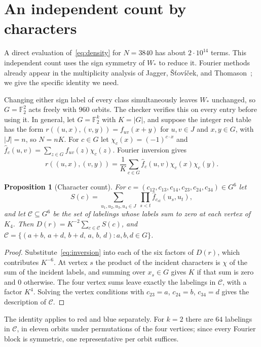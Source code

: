 \documentclass[11pt]{article}
\newtheorem{proposition}[theorem]{Proposition}
\theoremstyle{definition}
\theoremstyle{remark}
\newcommand{\FF}{\mathbb F}
\begin{document}
\section{An independent count by characters}
\label{app:count}
\label{sec:count}

A direct evaluation of~\eqref{eq:density} for $N=3840$ has about $2\cdot10^{14}$ terms.
This independent count uses the sign symmetry of $W_*$ to reduce it.
Fourier methods already appear in the multiplicity analysis of Jagger, \v{S}\v{t}ov\'{i}\v{c}ek, and Thomason~\cite{jagger1996}; we give the specific identity we need.

Changing either sign label of every class simultaneously leaves $W_*$ unchanged, so $G=\FF_2^2$ acts freely with $960$ orbits.
The checker verifies this on every entry before using it.
In general, let $G=\FF_2^k$ with $K=|G|$, and suppose the integer red table has the form $r((u,x),(v,y))=f_{uv}(x+y)$ for $u,v\in J$ and $x,y\in G$, with $|J|=n$, so $N=nK$.
For $c\in G$ let $\chi_c(x)=(-1)^{c\cdot x}$ and $\widehat f_c(u,v)=\sum_{z\in G}f_{uv}(z)\chi_c(z)$.
Fourier inversion gives
\begin{equation}
\label{eq:inversion}
 r((u,x),(v,y))=\frac1K\sum_{c\in G}\widehat f_c(u,v)\chi_c(x)\chi_c(y).
\end{equation}

\begin{proposition}[Character count]
\label{prop:character}
For $c=(c_{12},c_{13},c_{14},c_{23},c_{24},c_{34})\in G^6$ let
\[
 S(c)=\sum_{u_1,u_2,u_3,u_4\in J}\ \prod_{s<t}\widehat f_{c_{st}}(u_s,u_t),
\]
and let $\mathcal C\subseteq G^6$ be the set of labelings whose labels sum to zero at each vertex of $K_4$.
Then $D(r)=K^{-2}\sum_{c\in\mathcal C}S(c)$, and $\mathcal C=\{(a+b,\,a+d,\,b+d,\,a,\,b,\,d):a,b,d\in G\}$.
\end{proposition}
\begin{proof}
Substitute~\eqref{eq:inversion} into each of the six factors of $D(r)$, which contributes $K^{-6}$.
At vertex $s$ the product of the incident characters is $\chi$ of the sum of the incident labels, and summing over $x_s\in G$ gives $K$ if that sum is zero and $0$ otherwise.
The four vertex sums leave exactly the labelings in $\mathcal C$, with a factor $K^4$.
Solving the vertex conditions with $c_{23}=a$, $c_{24}=b$, $c_{34}=d$ gives the description of $\mathcal C$.
\end{proof}

The identity applies to red and blue separately.
For $k=2$ there are $64$ labelings in $\mathcal C$, in eleven orbits under permutations of the four vertices; since every Fourier block is symmetric, one representative per orbit suffices.
\end{document}
